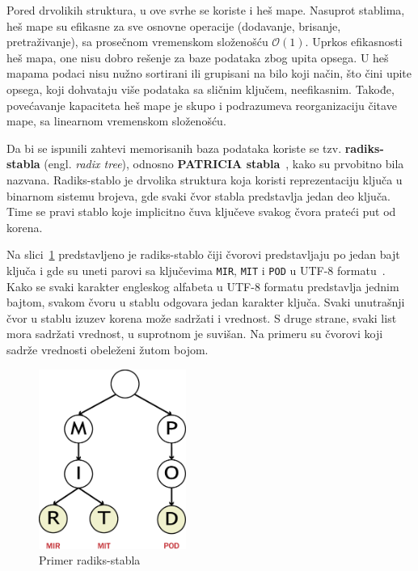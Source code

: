 \documentclass[12pt,oneside]{memoir}
\begin{document}
Pored drvolikih struktura, u ove svrhe se koriste i heš mape. Nasuprot
stablima, heš mape su efikasne za sve osnovne operacije (dodavanje, brisanje, pretraživanje),
sa prosečnom vremenskom složenošću $ \mathcal{O}(1) $. Uprkos efikasnosti heš mapa, one nisu
dobro rešenje za baze podataka zbog upita opsega. U heš mapama podaci nisu nužno sortirani ili
grupisani na bilo koji način, što čini upite opsega, koji dohvataju više podataka
sa sličnim ključem, neefikasnim.
Takođe, povećavanje kapaciteta heš mape je skupo i podrazumeva reorganizaciju
čitave mape, sa linearnom vremenskom složenošću.

Da bi se ispunili zahtevi memorisanih baza podataka koriste se tzv.
\textbf{radiks-stabla} (engl. \emph{radix tree}), odnosno
\textbf{PATRICIA stabla}~\cite{patricia}, kako su prvobitno bila nazvana.
Radiks-stablo je drvolika struktura koja koristi reprezentaciju ključa u
binarnom sistemu brojeva, gde svaki čvor stabla predstavlja jedan deo
ključa. Time se pravi stablo koje implicitno
čuva ključeve svakog čvora prateći put od korena.

Na slici~\ref{fig:radix} predstavljeno je radiks-stablo
čiji čvorovi predstavljaju po jedan bajt ključa i gde su uneti parovi sa
ključevima \texttt{MIR}, \texttt{MIT} i \texttt{POD} u
UTF-8 formatu~\cite{unicode}.
Kako se svaki karakter engleskog alfabeta u UTF-8 formatu predstavlja
jednim bajtom, svakom čvoru u stablu odgovara jedan karakter
ključa. Svaki unutrašnji čvor u stablu izuzev korena može sadržati i vrednost.
S druge strane, svaki list mora sadržati vrednost, u suprotnom je suvišan.
Na primeru su čvorovi koji sadrže vrednosti obeleženi žutom bojom.

\begin{figure}[!h]
  \centering
  \includegraphics[width=0.43\textwidth]{radix_tree.eps}
  \caption{Primer radiks-stabla}
  \label{fig:radix}
\end{figure}
\end{document}

